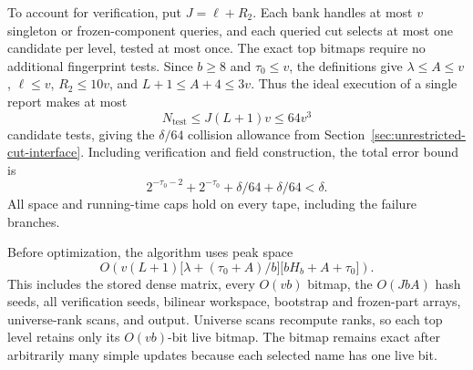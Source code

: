 \documentclass[11pt,letterpaper]{article}
\numberwithin{equation}{section}
\begin{document}
To account for verification, put $J=\ell+R_2$.
Each bank handles at most $v$ singleton or frozen-component queries, and each queried cut selects at most one candidate per level, tested at most once.
The exact top bitmaps require no additional fingerprint tests.
Since $b\ge8$ and $\tau_0\le v$, the definitions give $\lambda\le A\le v$, $\ell\le v$, $R_2\le10v$, and $L+1\le A+4\le3v$.
Thus the ideal execution of a single report makes at most
\[
 N_{\mathrm{test}}\le J(L+1)v\le64v^3
\]
candidate tests, giving the $\delta/64$ collision allowance from Section~\ref{sec:unrestricted-cut-interface}.
Including verification and field construction, the total error bound is
\[
       2^{-\tau_0-2}+2^{-\tau_0}+\delta/64+\delta/64<\delta.
\]
All space and running-time caps hold on every tape, including the failure branches.

Before optimization, the algorithm uses peak space
\begin{equation}
O\left(v(L+1)\bigl[\lambda+(\tau_0+A)/b\bigr]
                 \bigl[bH_b+A+\tau_0\bigr]\right).                 \label{eq:forest-df16}
\end{equation}
This includes the stored dense matrix, every $O(vb)$ bitmap, the $O(JbA)$ hash seeds, all verification seeds, bilinear workspace, bootstrap and frozen-part arrays, universe-rank scans, and output.
Universe scans recompute ranks, so each top level retains only its $O(vb)$-bit live bitmap.
The bitmap remains exact after arbitrarily many simple updates because each selected name has one live bit.
\end{document}
